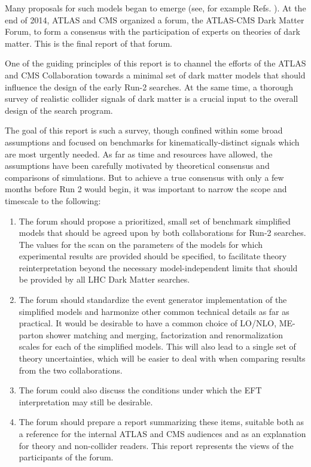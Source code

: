 Many proposals for such models began to emerge (see, for example
Refs. \cite{An:2012va,An:2012ue,Tait:2013,Buchmueller:2013dya,Bai:2013iqa,Bai:2014osa,An:201489115014,Yavin:14092893,Malik:2014ggr,Harris:2014hga,Buckley:2014fba,Haisch:2015ioa}). At
the end of 2014, ATLAS and CMS organized a forum, the ATLAS-CMS Dark
Matter Forum, to form a consensus with the participation of experts on
theories of dark matter. This is the final report of that forum.

One of the guiding principles of this report is to channel the efforts
of the ATLAS and CMS Collaboration towards a minimal set of dark
matter models that should influence the design of the early Run-2
searches. At the same time, a thorough survey of realistic collider
signals of dark matter is a crucial input to the overall design of the
search program.

The goal of this report is such a survey, though confined within some
broad assumptions and focused on benchmarks for kinematically-distinct
signals which are most urgently needed. As far as time and resources
have allowed, the assumptions have been carefully motivated by
theoretical consensus and comparisons of simulations. But to achieve a
true consensus with only a few months before Run 2 would begin, it was
important to narrow the scope and timescale to the following:

\begin{enumerate}
\item The forum should propose a prioritized, small set of benchmark
  simplified models that should be agreed upon by both collaborations for
  Run-2 searches. The values for the scan on the parameters of the models for which
  experimental results are provided should be specified, to facilitate theory reinterpretation 
  beyond the necessary model-independent limits that 
  should be provided by all LHC Dark Matter searches. 
\item The forum should standardize the event generator implementation
  of the simplified models and harmonize other common technical
  details as far as practical. It
  would be desirable to have a common choice of LO/NLO, ME-parton
  shower matching and merging, factorization and renormalization
  scales for each of the simplified models. This will also lead to a
  single set of theory uncertainties, which will be easier to deal
  with when comparing results from the two collaborations.
\item The forum could also discuss the conditions under which the EFT
  interpretation may still be desirable.
\item The forum should prepare a report summarizing these items,
  suitable both as a reference for the internal ATLAS and CMS
  audiences and as an explanation for theory and non-collider
  readers. This report represents the views of the participants of the
  forum.
\end{enumerate}

